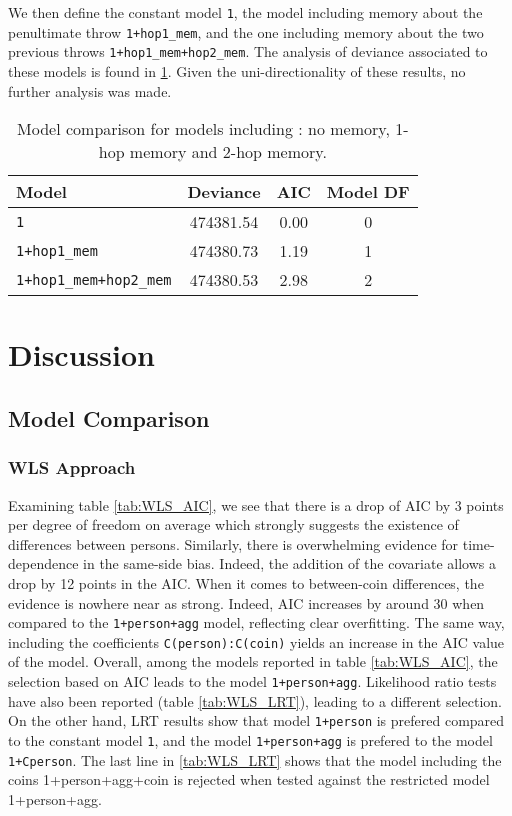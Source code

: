 \documentclass[a4paper, 12pt,oneside]{article}
\begin{document}
		We then define the constant model \texttt{1}, the model including memory about the penultimate throw \texttt{1+hop1\_mem}, and the one including memory about the two previous throws \texttt{1+hop1\_mem+hop2\_mem}. The analysis of deviance associated to these models is found in \ref{tab:memory-model-comparison}. Given the uni-directionality of these results, no further analysis was made.  
		\begin{table}[htb]
			\centering
			\caption{Model comparison for models including : no memory, 1-hop memory and 2-hop memory.}
			\label{tab:memory-model-comparison}
			\begin{tabular}{lccc}
			\toprule
			Model & Deviance & AIC & Model DF \\
			\midrule
			\texttt{1} & 474381.54 & 0.00 & 0 \\
			\texttt{1+hop1\_mem} & 474380.73 & 1.19 & 1 \\
			\texttt{1+hop1\_mem+hop2\_mem} & 474380.53 & 2.98 & 2 \\
			\bottomrule
			\end{tabular}
		\end{table}
	\section{Discussion}
		\subsection{Model Comparison}
		\subsubsection{WLS Approach}
		Examining table \ref{tab:WLS_AIC}, we see that there is a drop of AIC by 3 points per degree of freedom on average which strongly suggests the existence of differences between persons. Similarly, there is overwhelming evidence for time-dependence in the same-side bias. Indeed, the addition of the  covariate allows a drop by 12 points in the AIC. When it comes to between-coin differences, the evidence is nowhere near as strong. Indeed, AIC increases by around 30 when compared to the \texttt{1+person+agg} model, reflecting clear overfitting.
		The same way, including the coefficients \texttt{C(person):C(coin)} yields an increase in the AIC value of the model. 
		Overall, among the models reported in table \ref{tab:WLS_AIC}, the selection based on AIC leads to the model \texttt{1+person+agg}. 
		Likelihood ratio tests have also been reported (table \ref{tab:WLS_LRT}), leading to a different selection. On the other hand, LRT results show that model \texttt{1+person} is prefered compared to the constant model \texttt{1}, and the model \texttt{1+person+agg} is prefered to the model \texttt{1+Cperson}. The last line in \ref{tab:WLS_LRT} shows that the model including the coins {1+person+agg+coin} is rejected when tested against the restricted model {1+person+agg}. 
		
\end{document}
